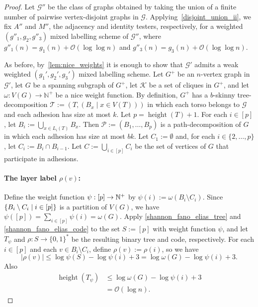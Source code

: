 \documentclass{patmorin}
\renewcommand{\leq}{\leqslant}
\newcommand{\gwen}[1]{\textcolor{Purple}{GJ: #1}}
\DeclareMathOperator{\height}{height}
\newcommand{\NN}{\mathbb{N}}
\newcommand{\Oh}{\calO}
\DeclarePairedDelimiter{\set}{\{}{\}}
\newcommand{\calG}{\mathcal{G}}
\newcommand{\calK}{\mathcal{K}}
\newcommand{\calO}{\mathcal{O}}
\newcommand{\calP}{\mathcal{P}}
\newcommand{\calT}{\mathcal{T}}
\begin{document}
  \begin{proof}

    Let $\mathcal{G''}$ be the class of graphs obtained by taking the union of a finite number of pairwise vertex-disjoint graphs in $\calG$. 
    Applying~\cref{disjoint_union_ii}, we fix $A''$ and $M''$, the adjacency and identity testers, respectively, for a weighted $(g''_1,g_2,g''_3)$ mixed labelling scheme of $\mathcal{G''}$, where $g''_1(n) = g_1(n) + \Oh(\log\log n)$ and $g''_3(n) = g_3(n) + \Oh(\log\log n)$. 

     As before,  by~\cref{lem:nice_weights} it is enough to show that $\calG'$ admits a weak weighted $(g_1',g_2',g_3')$ mixed labelling scheme. 
    Let $G^+$ be an $n$-vertex graph in $\calG'$, let $G$ be a spanning subgraph of $G^+$, let $\calK$ be a set of cliques in $G^+$, and let $\omega:V(G)\to\NN^+$ be a nice weight function.
    By definition, $G^+$ has a $b$-skinny tree-decomposition $\calT:=(T,(B_x\mid x\in V(T)))$ in which each torso belongs to $\calG$ and each adhesion has size at most $k$. 
    Let $p=\height(T)+1$. 
    For each $i\in[p]$, let $B_i:=\bigcup_{x\in L_i(T)} B_x$.  Then $\calP:=(B_1,\ldots,B_p)$ is a path-decomposition of $G$ in which each adhesion has size at most $bk$.
    Let $C_1:=\emptyset$ and, for each $i\in\{2,\ldots,p\}$, let $C_i:=B_i\cap B_{i-1}$.  
    Let $C:=\bigcup_{i\in[p]} C_i$  be the set of vertices of $G$ that participate in adhesions.


    \paragraph{\boldmath The layer label $\rho(v)$:}
    Define the weight function $\psi:[p]\to\mathbb{N}^+$ by $\psi(i):=\omega(B_i\setminus C_i)$.
    Since $\set{B_i\setminus C_i\mid i\in[p]}$ is a partition of $V(G)$, we have  $\psi([p])=\sum_{i\in[p]}\psi(i)=\omega(G)$.
    Apply \cref{shannon_fano_elias_tree} and \cref{shannon_fano_elias_code} to the set $S:=[p]$ with weight function $\psi$, and let $T_\psi$ and $\rho:S\to\{0,1\}^*$ be the resulting binary tree and code, respectively.
    For each $i\in[p]$ and each $v\in B_i\setminus C_i$, define $\rho(v):=\rho(i)$, so we have
    \begin{equation}
    \label{eq:rho}
    |\rho(v)| \leq \log\psi(S)-\log\psi(i)+3=\log\omega(G)-\log\psi(i)+3.
    \end{equation}
    Also
    \begin{equation}
    \label{eq:height-T-psi}
    \begin{split}
    \height(T_{\psi}) 
    &\leq \log\omega(G)-\log\psi(i)+3\\  
    &=\Oh(\log n).
    \end{split}
    \end{equation}


\end{proof}
\end{document}
